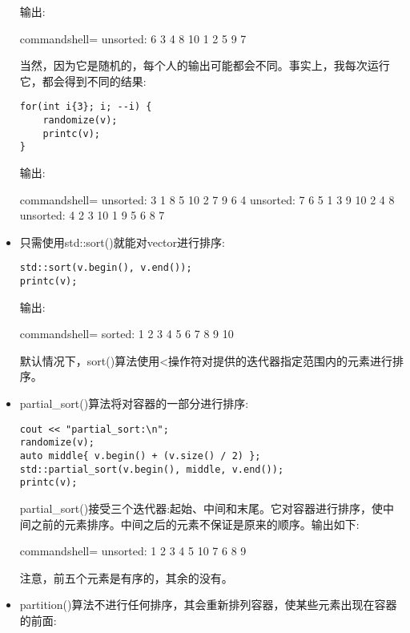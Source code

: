\begin{itemize}
输出:

\begin{tcblisting}{commandshell={}}
unsorted: 6 3 4 8 10 1 2 5 9 7
\end{tcblisting}

当然，因为它是随机的，每个人的输出可能都会不同。事实上，我每次运行它，都会得到不同的结果:

\begin{lstlisting}[style=styleCXX]
for(int i{3}; i; --i) {
	randomize(v);
	printc(v);
}
\end{lstlisting}

输出:

\begin{tcblisting}{commandshell={}}
unsorted: 3 1 8 5 10 2 7 9 6 4
unsorted: 7 6 5 1 3 9 10 2 4 8
unsorted: 4 2 3 10 1 9 5 6 8 7
\end{tcblisting}

\item 
只需使用std::sort()就能对vector进行排序:

\begin{lstlisting}[style=styleCXX]
std::sort(v.begin(), v.end());
printc(v);
\end{lstlisting}

输出:

\begin{tcblisting}{commandshell={}}
sorted: 1 2 3 4 5 6 7 8 9 10
\end{tcblisting}

默认情况下，sort()算法使用<操作符对提供的迭代器指定范围内的元素进行排序。

\item 
partial\_sort()算法将对容器的一部分进行排序:

\begin{lstlisting}[style=styleCXX]
cout << "partial_sort:\n";
randomize(v);
auto middle{ v.begin() + (v.size() / 2) };
std::partial_sort(v.begin(), middle, v.end());
printc(v);
\end{lstlisting}

partial\_sort()接受三个迭代器:起始、中间和末尾。它对容器进行排序，使中间之前的元素排序。中间之后的元素不保证是原来的顺序。输出如下:

\begin{tcblisting}{commandshell={}}
unsorted: 1 2 3 4 5 10 7 6 8 9
\end{tcblisting}

注意，前五个元素是有序的，其余的没有。

\item 
partition()算法不进行任何排序，其会重新排列容器，使某些元素出现在容器的前面:


\end{itemize}
